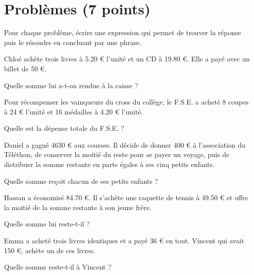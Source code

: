 \section{Problèmes (7 points)}

Pour chaque problème, écrire une expression qui permet de trouver la réponse puis le résoudre en concluant par une phrase.

\begin{questions}
	\question[1] Chloé achète trois livres à \num{5.20} € l'unité et un CD à \num{19.80} €. Elle a payé avec un billet de 50 €. 
	
	Quelle somme lui a-t-on rendue à la caisse ?
	
	\question[1\half] Pour récompenser les vainqueurs du cross du collège, le F.S.E. a acheté 8 coupes à 24 € l'unité et 16 médailles à \num{4.20} € l'unité.
	
	Quelle est la dépense totale du F.S.E. ?
	
	\question[1\half] Daniel a gagné \num{4630} € aux courses. Il décide de donner 400 € à l'association du Téléthon, de conserver la moitié du reste pour se payer un voyage, puis de distribuer la somme restante en parts égales à ses cinq petits enfants.
	
	Quelle somme reçoit chacun de ses petits enfants ?
	
	\question[1\half] Hassan a économisé \num{84.70} €. Il s'achète une raquette de tennis à \num{49.50} € et offre la moitié de la somme restante à son jeune frère. 
	
	Quelle somme lui reste-t-il ?
	
	\question[1\half] Emma a acheté trois livres identiques et a payé 36 € en tout. Vincent qui avait 150 €, achète un de ces livres. 
	
	Quelle somme reste-t-il à Vincent ?
	
%		
%		
\end{questions}